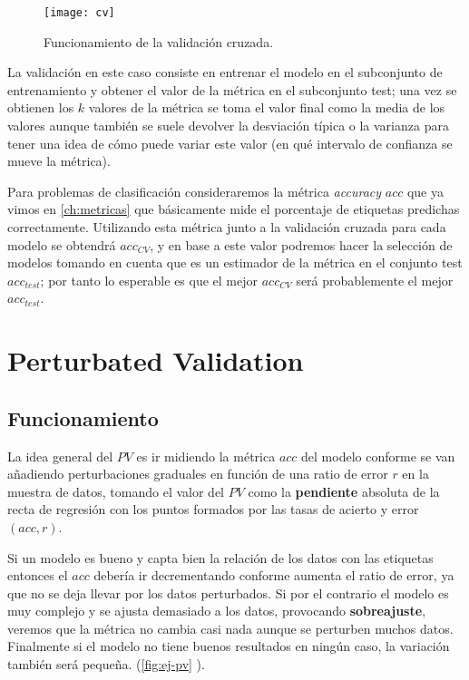 \begin{figure}[htbp]
  \centering
  \texttt{[image: cv]}
  \caption{Funcionamiento de la validación cruzada.}
  \label{fig:cv}
\end{figure}


La validación en este caso consiste en entrenar el modelo en el subconjunto de entrenamiento y obtener el valor de la métrica en el subconjunto test; una vez se obtienen los $k$ valores de la métrica se toma el valor final como la media de los valores aunque también se suele devolver la desviación típica o la varianza para tener una idea de cómo puede variar este valor (en qué intervalo de confianza se mueve la métrica).

Para problemas de clasificación consideraremos la métrica \emph{accuracy} $acc$ que ya vimos en \autoref{ch:metricas} que básicamente mide el porcentaje de etiquetas predichas correctamente. Utilizando esta métrica junto a la validación cruzada para cada modelo se obtendrá $acc_{CV}$, y en base a este valor podremos hacer la selección de modelos tomando en cuenta que es un estimador de la métrica en el conjunto test $acc_{test}$; por tanto lo esperable es que el mejor $acc_{CV}$ será probablemente el mejor $acc_{test}$.

\section{Perturbated Validation}

\subsection{Funcionamiento}

La idea general del $PV$ es ir midiendo la métrica $acc$ del modelo conforme se van añadiendo perturbaciones graduales en función de una ratio de error $r$ en la muestra de datos, tomando el valor del $PV$ como la \textbf{pendiente} absoluta de la recta de regresión con los puntos formados por las tasas de acierto y error $(acc, r)$.

Si un modelo es bueno y capta bien la relación de los datos con las etiquetas entonces el $acc$ debería ir decrementando conforme aumenta el ratio de error, ya que no se deja llevar por los datos perturbados. Si por el contrario el modelo es muy complejo y se ajusta demasiado a los datos, provocando \textbf{sobreajuste}, veremos que la métrica no cambia casi nada aunque se perturben muchos datos. Finalmente si el modelo no tiene buenos resultados en ningún caso, la variación también será pequeña. (\autoref{fig:ej-pv} \cite{zhang2019perturbation}).

